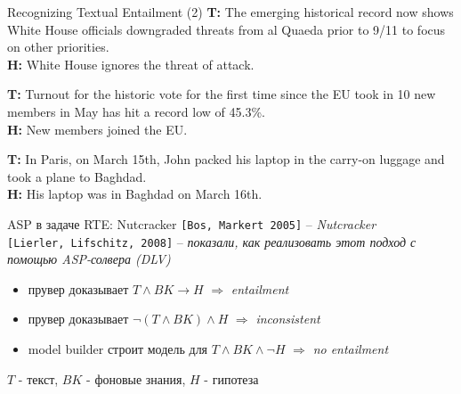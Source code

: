 \documentclass{beamer}
\begin{document}
\begin{frame}{Recognizing Textual Entailment (2)}
\textbf{T:} The emerging historical record now shows White House officials downgraded threats from al Quaeda prior to 9/11 to focus on other priorities.\\
\textbf{H:} White House ignores the threat of attack.\bigskip 

\textbf{T:} Turnout for the historic vote for the first time since the EU took in 10 new members in May has hit a record low of 45.3\%.\\
\textbf{H:} New members joined the EU.\bigskip

\textbf{T:} In Paris, on March 15th, John packed his laptop in the carry-on luggage and took a plane to Baghdad.\\
\textbf{H:} His laptop was in Baghdad on March 16th.
\end{frame}

\begin{frame}{ASP в задаче RTE: Nutcracker}
\texttt{[Bos, Markert 2005]} -- \textit{Nutcracker}\\
\texttt{[Lierler, Lifschitz, 2008]} -- \textit{показали, как реализовать этот подход с помощью ASP-солвера (DLV)}\bigskip

\begin{itemize}
  \item прувер доказывает $T \wedge BK \to H$ $\Rightarrow$ \textit{entailment}
  \item прувер доказывает $\neg (T \wedge BK) \wedge H$ $\Rightarrow$ \textit{inconsistent}
  \item model builder строит модель для $T \wedge BK \wedge \neg H$ $\Rightarrow$ \textit{no entailment}
\end{itemize}\bigskip

{\footnotesize $T$ - текст, $BK$ - фоновые знания, $H$ - гипотеза}

\end{frame}
\end{document}
